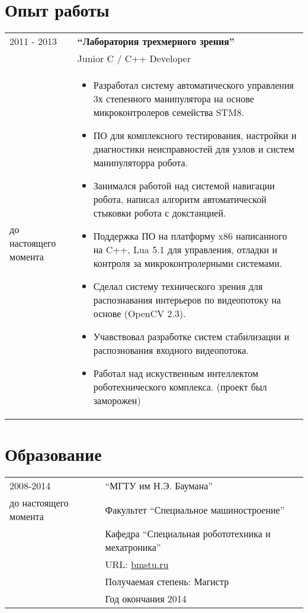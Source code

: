 \documentclass[a4paper, 11pt]{article}
\begin{document}
\section{Опыт работы }
\begin{tabular}{p{25mm}|p{110mm}}
2011 - 2013 & \textbf{``Лаборатория трехмерного зрения''} \\
& Junior C / C++ Developer \\
до настоящего момента &
\begin{itemize}
    \item Разработал систему автоматического управления
    3х степенного манипулятора на основе микроконтролеров семейства STM8.
    \item ПО для комплексного тестирования, настройки и диагностики
    неисправностей для узлов и систем манипуляторра робота.
    \item Занимался работой над системой навигации робота,
    написал алгоритм автоматической стыковки робота с докстанцией.
    \item Поддержка ПО на платформу x86 написанного на C++, Lua 5.1
    для управления, отладки и контроля за микроконтролерными системами.
    \item Сделал систему технического зрения для
    распознавания интерьеров по видеопотоку на основе (OpenCV 2.3).
    \item Учавствовал разработке систем стабилизации и
    распознования входного видеопотока.
    \item Работал над искуственным интеллектом роботехнического комплекса.
    (проект был заморожен)
\end{itemize}
\\
\end{tabular}

\section{Образование}
\begin{tabular}{p{25mm}|p{110mm}}
2008-2014             & ``МГТУ им Н.Э. Баумана'' \\
до настоящего момента & Факультет ``Специальное машиностроение'' \\
                      & Кафедра ``Специальная робототехника и мехатроника'' \\
                      & URL: \href{http://bmstu.ru}{bmstu.ru} \\
                      & Получаемая степень: Магистр \\
                      & Год окончания 2014
\end{tabular}
\end{document}
